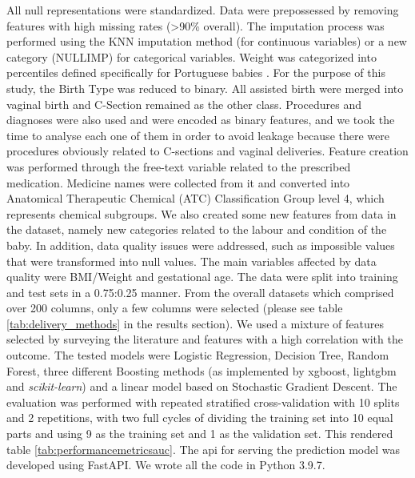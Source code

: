 All null representations were standardized. Data were prepossessed by removing features with high missing rates ({\textgreater}90\% overall). The imputation process was performed using the KNN imputation method (for continuous variables) or a new category (NULLIMP) for categorical variables. Weight was categorized into percentiles defined specifically for Portuguese babies \cite{sousa-santosDevelopmentBirthweightStandard2016}. For the purpose of this study, the Birth Type was reduced to binary. All assisted birth were merged into vaginal birth and C-Section remained as the other class. Procedures and diagnoses were also used and were encoded as binary features, and we took the time to analyse each one of them in order to avoid leakage because there were procedures obviously related to C-sections and vaginal deliveries. Feature creation was performed through the free-text variable related to the prescribed medication. Medicine names were collected from it and converted into Anatomical Therapeutic Chemical (ATC) Classification Group level 4, which represents chemical subgroups. We also created some new features from data in the dataset, namely new categories related to the labour and condition of the baby. In addition, data quality issues were addressed, such as impossible values that were transformed into null values. The main variables affected by data quality were BMI/Weight and gestational age. The data were split into training and test sets in a 0.75:0.25 manner. From the overall datasets which comprised over 200 columns, only a few columns were selected (please see table \ref{tab:delivery_methods} in the results section). We used a mixture of features selected by surveying the literature \cite{irwindaMaternalFetalCharacteristics2021,deramonfernandezPredictionModeDelivery2022,parveenAnalysisCesareanSections2021} and features with a high correlation with the outcome. The tested models were Logistic Regression, Decision Tree, Random Forest, three different Boosting methods (as implemented by \ac{xgboost}, \ac{lightgbm} and \textit{scikit-learn}) and a linear model based on Stochastic Gradient Descent. The evaluation was performed with repeated stratified cross-validation with 10 splits and 2 repetitions, with two full cycles of dividing the training set into 10 equal parts and using 9 as the training set and 1 as the validation set. This rendered table \ref{tab:performancemetricsauc}. The \ac{api} for serving the prediction model was developed using FastAPI. We wrote all the code in Python 3.9.7.


